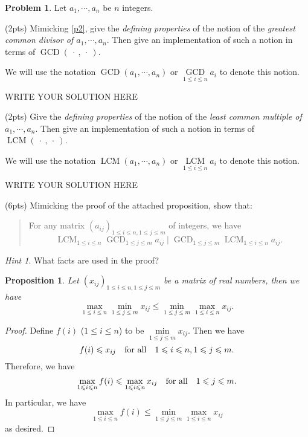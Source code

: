 \documentclass[11pt]{article}
\theoremstyle{plain}
\newtheorem*{propstar}{Proposition}
\theoremstyle{definition}
\newtheorem{problem}{Problem}
\theoremstyle{remark}
\newtheorem*{hint}{Hint}
\numberwithin{equation}{problem}
\DeclareMathOperator*\GCD{GCD}
\DeclareMathOperator*\LCM{LCM}
\begin{document}
\begin{problem}
	Let $a_1,\cdots,a_n$ be $n$ integers. 
	\begin{listinprob}
		\item\label{3.a} (2pts) Mimicking \cref{p2}, give the \emph{defining properties} of the notion of the \emph{greatest common divisor of $a_1,\cdots,a_n$}. Then give an implementation of such a notion in terms of $\GCD(\:\cdot\:,\:\cdot\:)$. 
		
		We will use the notation $\GCD(a_1,\cdots,a_n)$ or $\GCD\limits_{1\le i\le n}a_i$ to denote this notion.

\begin{solution} %
WRITE YOUR SOLUTION HERE
\end{solution}\clearpage %

		\item\label{3.b} (2pts) Give the \emph{defining properties} of the notion of the \emph{least common multiple of $a_1,\cdots,a_n$}. Then give an implementation of such a notion in terms of $\LCM(\:\cdot\:,\:\cdot\:)$. 
		
		We will use the notation $\LCM(a_1,\cdots,a_n)$ or $\LCM\limits_{1\le i\le n}a_i$ to denote this notion.

\begin{solution} %
WRITE YOUR SOLUTION HERE
\end{solution}\clearpage %

		\item\label{3.c} (6pts) Mimicking the proof of the attached proposition, show that: 
		\begin{quote}
			For any matrix $(a_{ij})_{1\le i\le n, 1\le j\le m}$ of integers, we have 
			\[
				\LCM_{1\le i\le n}\GCD_{1\le j\le m} a_{ij} \mid 
				\GCD_{1\le j\le m}\LCM_{1\le i\le n} a_{ij}.
			\]
		\end{quote}
		\begin{hint}
			What facts are used in the proof?
		\end{hint}
	\end{listinprob}
	\begin{tcolorbox}
		\begin{propstar}\label{prop}
			Let $(x_{ij})_{1\le i\le n, 1\le j\le m}$ be a matrix of real numbers, then we have 
			\[
				\max_{1\le i\le n}\min_{1\le j\le m} x_{ij} \le 
				\min_{1\le j\le m}\max_{1\le i\le n} x_{ij}.
			\]
		\end{propstar}
		\begin{proof}
			Define $f(i)$ ($1\le i\le n$) to be $\min\limits_{1\le j\le m}x_{ij}$. Then we have 
			\[
				f(i) \leqslant x_{ij} \quad\text{for all}\quad 1\leqslant i\leqslant n, 1\leqslant j\leqslant m.
			\]
			Therefore, we have 
			\[
				\max_{1\leqslant i\leqslant n}f(i) \leqslant \max_{1\leqslant i\leqslant n} x_{ij} 
				\quad\text{for all}\quad 1\leqslant j\leqslant m.
			\]
			In particular, we have 
			\[
				\max_{1\le i\le n}f(i) \le \min_{1\le j\le m}\max_{1\le i\le n} x_{ij}
			\]
			as desired.
		\end{proof}
	\end{tcolorbox}
\end{problem}
\end{document}
